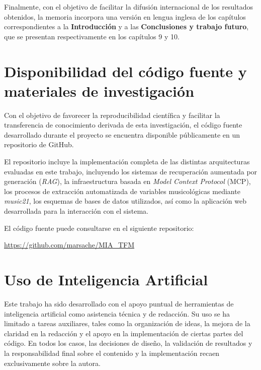 Finalmente, con el objetivo de facilitar la difusión internacional de los resultados obtenidos, la memoria incorpora una versión en lengua inglesa de los capítulos correspondientes a la \textbf{Introducción} y a las \textbf{Conclusiones y trabajo futuro}, que se presentan respectivamente en los capítulos 9 y 10.

\section{Disponibilidad del código fuente y materiales de investigación}
Con el objetivo de favorecer la reproducibilidad científica y facilitar la transferencia de conocimiento derivada de esta investigación, el código fuente desarrollado durante el proyecto se encuentra disponible públicamente en un repositorio de GitHub.

El repositorio incluye la implementación completa de las distintas arquitecturas evaluadas en este trabajo, incluyendo los sistemas de recuperación aumentada por generación (\textit{RAG}), la infraestructura basada en \textit{Model Context Protocol} (MCP), los procesos de extracción automatizada de variables musicológicas mediante \textit{music21}, los esquemas de bases de datos utilizados, así como la aplicación web desarrollada para la interacción con el sistema.

El código fuente puede consultarse en el siguiente repositorio:

\begin{center}
\url{https://github.com/marsache/MIA_TFM}
\end{center}

\section{Uso de Inteligencia Artificial}
Este trabajo ha sido desarrollado con el apoyo puntual de herramientas de inteligencia artificial como asistencia técnica y de redacción. Su uso se ha limitado a tareas auxiliares, tales como la organización de ideas, la mejora de la claridad en la redacción y el apoyo en la implementación de ciertas partes del código. En todos los casos, las decisiones de diseño, la validación de resultados y la responsabilidad final sobre el contenido y la implementación recaen exclusivamente sobre la autora.



